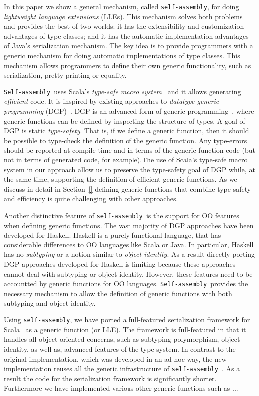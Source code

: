\documentclass[preprint]{sigplanconf}
\newcommand{\selfassembly}{\texttt{self-assembly~}}
\newcommand{\Selfassembly}{\texttt{Self-assembly~}}
\newcommand{\sselfassembly}{\texttt{self-assembly}}
\begin{document}
In this paper we show a general mechanism, called \sselfassembly, for doing \emph{lightweight
  language extensions} (LLEs). This mechanism solves both problems and
provides the best of two worlds: it has the extensibility and
customization advantages of type classes; and it has the automatic
implementation advantages of Java's serialization mechanism.  The key
idea is to provide programmers with a generic mechanism for doing automatic
implementations of type classes. This mechanism allows programmers
to define their own generic functionality, such as serialization,
pretty printing or equality.

\Selfassembly uses Scala's \emph{type-safe macro
  system}~\cite{Burmako2012, Burmako2013} and it allows generating \emph{efficient} code.  It
is inspired by existing approaches to \emph{datatype-generic
  programming} (DGP)~\cite{ComparingGPHaskellRodriquez,
  ComparingGPHaskellHinze}. DGP is an advanced form of generic
programming~\cite{}, where generic functions can be defined by
inspecting the structure of types. A goal of DGP is static
\emph{type-safety}. That is, if we define a generic function, then it
should be possible to type-check the definition of the generic
function. Any type-errors should be reported at compile-time and in
terms of the generic function code (but not in terms of generated
code, for example).The use of Scala's type-safe macro
system in our approach allow us to preserve the type-safety goal of
DGP while, at the same time, supporting the definition of efficient
generic functions.  As we discuss in detail in Section~\ref{} defining
generic functions that combine type-safety and efficiency is quite
challenging with other approaches.

Another distinctive feature of \selfassembly is the support for OO
features when defining generic functions. The vast majority of DGP
approaches have been developed for Haskell. Haskell is a purely
functional language, that has considerable differences to OO languages
like Scala or Java. In particular, Haskell has no \emph{subtyping} or a
notion similar to \emph{object identity}. As a result directly porting
DGP approaches developed for Haskell is limiting because these
approaches cannot deal with subtyping or object identity. However,
these features need to be accountted by generic functions for OO
languages. \Selfassembly provides the necessary mechanism to allow
the definition of generic functions with both subtyping and object identity.

Using \sselfassembly, we have ported a full-featured serialization
framework for Scala~\cite{} as a generic function (or LLE). The
framework is full-featured in that it handles all object-oriented
concerns, such as subtyping polymorphism, object identity, as well as,
advanced features of the type system. In contrast to the original
implementation, which was developed in an ad-hoc way, the new
implementation reuses all the generic infrastructure of
\selfassembly. As a result the code for the serialization framework is
significantly shorter. Furthermore we have implemented various other
generic functions such as ...
\end{document}
